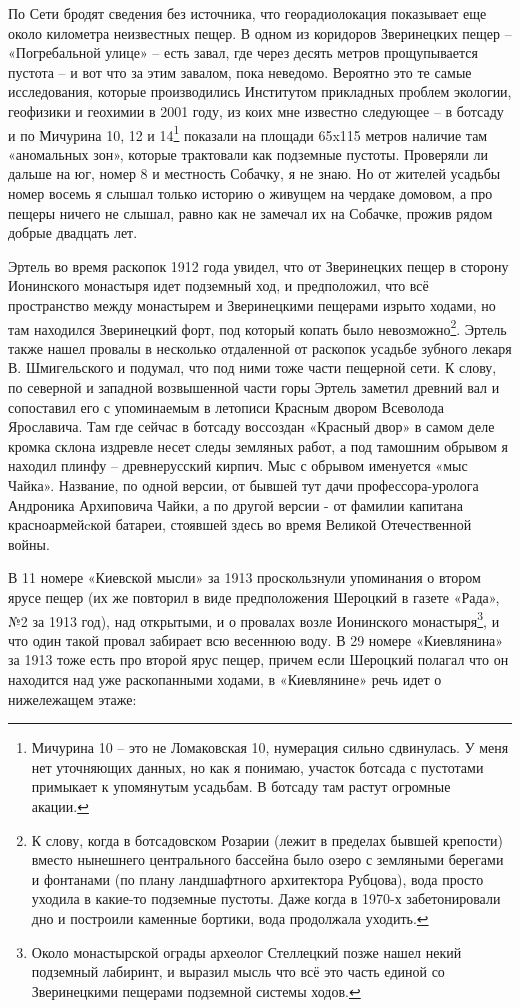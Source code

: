 По Сети бродят сведения без источника, что георадиолокация показывает еще около километра неизвестных пещер. В одном из коридоров Зверинецких пещер – «Погребальной улице» – есть завал, где через десять метров прощупывается пустота – и вот что за этим завалом, пока неведомо. Вероятно это те самые исследования, которые производились Институтом прикладных проблем экологии, геофизики и геохимии в 2001 году, из коих мне известно следующее – в ботсаду и по Мичурина 10, 12 и 14\footnote{Мичурина 10 – это не Ломаковская 10, нумерация сильно сдвинулась. У меня нет уточняющих данных, но как я понимаю, участок ботсада с пустотами примыкает к упомянутым усадьбам. В ботсаду там растут огромные акации.} показали на площади 65x115 метров наличие там «аномальных зон», которые трактовали как подземные пустоты. Проверяли ли дальше на юг, номер 8 и местность Собачку, я не знаю. Но от жителей усадьбы номер восемь я слышал только историю о живущем на чердаке домовом, а про пещеры ничего не слышал, равно как не замечал их на Собачке, прожив рядом добрые двадцать лет.

Эртель во время раскопок 1912 года увидел, что от Зверинецких пещер в сторону Ионинского монастыря идет подземный ход, и предположил, что всё пространство между монастырем и Зверинецкими пещерами изрыто ходами, но там находился Зверинецкий форт, под который копать было невозможно\footnote{К слову, когда в ботсадовском Розарии (лежит в пределах бывшей крепости) вместо нынешнего центрального бассейна было озеро с земляными берегами и фонтанами (по плану ландшафтного архитектора Рубцова), вода просто уходила в какие-то подземные пустоты. Даже когда в 1970-х забетонировали дно и построили каменные бортики, вода продолжала уходить.}. Эртель также нашел провалы в несколько отдаленной от раскопок усадьбе зубного лекаря В. Шмигельского и подумал, что под ними тоже части пещерной сети. К слову, по северной и западной возвышенной части горы Эртель заметил древний вал и сопоставил его с упоминаемым в летописи Красным двором Всеволода Ярославича. Там где сейчас в ботсаду воссоздан «Красный двор» в самом деле кромка склона издревле несет следы земляных работ, а под тамошним обрывом я находил плинфу – древнерусский кирпич. Мыс с обрывом именуется «мыс Чайка». Название, по одной версии, от бывшей тут дачи профессора-уролога Андроника Архиповича Чайки, а по другой версии - от фамилии капитана красноармейcкой батареи, стоявшей здесь во время Великой Отечественной войны.

В 11 номере «Киевской мысли» за 1913 проскользнули упоминания о втором ярусе пещер (их же повторил в виде предположения Шероцкий в газете «Рада», №2 за 1913 год), над открытыми, и о провалах возле Ионинского монастыря\footnote{Около монастырской ограды археолог Стеллецкий позже нашел некий подземный лабиринт, и выразил мысль что всё это часть единой со Зверинецкими пещерами подземной системы ходов.}, и что один такой провал забирает всю весеннюю воду. В 29 номере «Киевлянина» за 1913 тоже есть про второй ярус пещер, причем если Шероцкий полагал что он находится над уже раскопанными ходами, в «Киевлянине» речь идет о нижележащем этаже:

